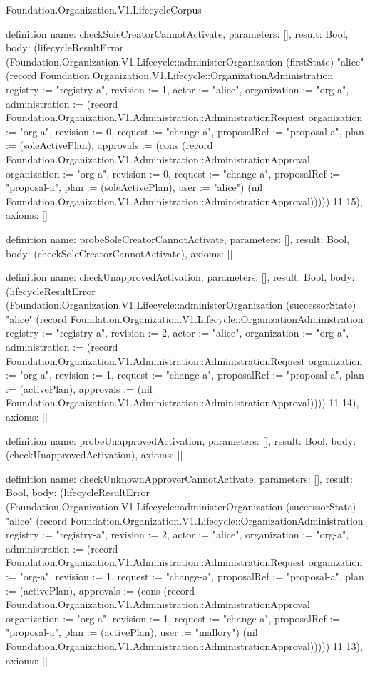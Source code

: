 \begin{lexlean}{Foundation.Organization.V1.LifecycleCorpus}
\begin{semanticmodule}
definition{
  name: checkSoleCreatorCannotActivate,
  parameters: [],
  result: Bool,
  body: (lifecycleResultError (Foundation.Organization.V1.Lifecycle::administerOrganization (firstState) "alice" (record Foundation.Organization.V1.Lifecycle::OrganizationAdministration {registry := "registry-a", revision := 1, actor := "alice", organization := "org-a", administration := (record Foundation.Organization.V1.Administration::AdministrationRequest {organization := "org-a", revision := 0, request := "change-a", proposalRef := "proposal-a", plan := (soleActivePlan), approvals := (cons (record Foundation.Organization.V1.Administration::AdministrationApproval {organization := "org-a", revision := 0, request := "change-a", proposalRef := "proposal-a", plan := (soleActivePlan), user := "alice"}) (nil Foundation.Organization.V1.Administration::AdministrationApproval))})})) 11 15),
  axioms: []
}

definition{
  name: probeSoleCreatorCannotActivate,
  parameters: [],
  result: Bool,
  body: (checkSoleCreatorCannotActivate),
  axioms: []
}

definition{
  name: checkUnapprovedActivation,
  parameters: [],
  result: Bool,
  body: (lifecycleResultError (Foundation.Organization.V1.Lifecycle::administerOrganization (successorState) "alice" (record Foundation.Organization.V1.Lifecycle::OrganizationAdministration {registry := "registry-a", revision := 2, actor := "alice", organization := "org-a", administration := (record Foundation.Organization.V1.Administration::AdministrationRequest {organization := "org-a", revision := 1, request := "change-a", proposalRef := "proposal-a", plan := (activePlan), approvals := (nil Foundation.Organization.V1.Administration::AdministrationApproval)})})) 11 14),
  axioms: []
}

definition{
  name: probeUnapprovedActivation,
  parameters: [],
  result: Bool,
  body: (checkUnapprovedActivation),
  axioms: []
}

definition{
  name: checkUnknownApproverCannotActivate,
  parameters: [],
  result: Bool,
  body: (lifecycleResultError (Foundation.Organization.V1.Lifecycle::administerOrganization (successorState) "alice" (record Foundation.Organization.V1.Lifecycle::OrganizationAdministration {registry := "registry-a", revision := 2, actor := "alice", organization := "org-a", administration := (record Foundation.Organization.V1.Administration::AdministrationRequest {organization := "org-a", revision := 1, request := "change-a", proposalRef := "proposal-a", plan := (activePlan), approvals := (cons (record Foundation.Organization.V1.Administration::AdministrationApproval {organization := "org-a", revision := 1, request := "change-a", proposalRef := "proposal-a", plan := (activePlan), user := "mallory"}) (nil Foundation.Organization.V1.Administration::AdministrationApproval))})})) 11 13),
  axioms: []
}


\end{semanticmodule}
\end{lexlean}
